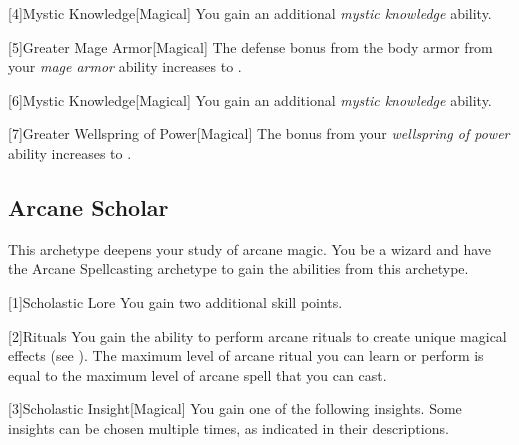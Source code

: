         [4]{Mystic Knowledge}[Magical]
        You gain an additional \textit{mystic knowledge} ability.

        [5]{Greater Mage Armor}[Magical]
        The defense bonus from the body armor from your \textit{mage armor} ability increases to .

        [6]{Mystic Knowledge}[Magical]
        You gain an additional \textit{mystic knowledge} ability.

        [7]{Greater Wellspring of Power}[Magical]
        The bonus from your \textit{wellspring of power} ability increases to .

    \subsection{Arcane Scholar}
        This archetype deepens your study of arcane magic.
        You be a wizard and have the Arcane Spellcasting archetype to gain the abilities from this archetype.

        [1]{Scholastic Lore} You gain two additional skill points.

        [2]{Rituals} You gain the ability to perform arcane rituals to create unique magical effects (see ).
        The maximum level of arcane ritual you can learn or perform is equal to the maximum level of arcane spell that you can cast.

        [3]{Scholastic Insight}[Magical]
        You gain one of the following insights.
        Some insights can be chosen multiple times, as indicated in their descriptions.

